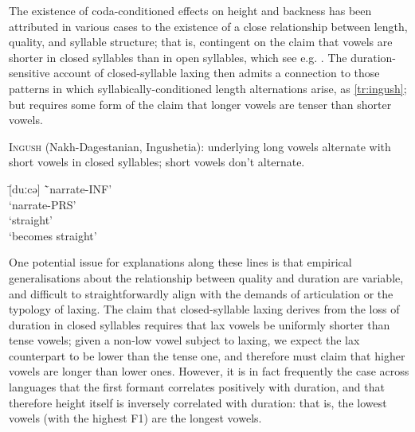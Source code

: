 The existence of coda-conditioned effects on height and backness has been attributed in various cases \citep{Fery2003,Botma2012} to the existence of a close relationship between length, quality, and syllable structure; that is, contingent on the claim that vowels are shorter in closed syllables than in open syllables, which see e.g. \citet{Maddieson1985}. The duration-sensitive account of closed-syllable laxing then admits a connection to those patterns in which syllabically-conditioned length alternations arise, as \cref{tr:ingush}; but requires some form of the claim that longer vowels are tenser than shorter vowels.

\begin{example} \label{tr:ingush}
  \textsc{Ingush} (Nakh-Dagestanian, Ingushetia): underlying long vowels alternate with short vowels in closed syllables; short vowels don't alternate. \citep{Nichols2011}
  \begin{tabbing}
   \tab[2cm] \= [duːcə] \tab[2cm] \= `narrate-{\sc\scriptsize INF}'\\
   \> [ducː] \> `narrate-{\sc\scriptsize PRS}'\\
   \> [niːsə] \> `straight'\\
   \> [nis.lu] \> `becomes straight'

    \end{tabbing}
\end{example}

One potential issue for explanations along these lines is that empirical generalisations about the relationship between quality and duration are variable, and difficult to straightforwardly align with the demands of articulation or the typology of laxing. The claim that closed-syllable laxing derives from the loss of duration in closed syllables requires that lax vowels be uniformly shorter than tense vowels; given a non-low vowel subject to laxing, we expect the lax counterpart to be lower than the tense one, and therefore must claim that higher vowels are longer than lower ones. However, it is in fact frequently the case across languages that the first formant correlates positively with duration, and that therefore height itself is inversely correlated with duration: that is, the lowest vowels (with the highest F1) are the longest vowels.

